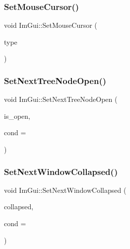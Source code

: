 \hypertarget{namespace_im_gui_ae212a3516efcba50a684df202c8e63ad}{}\label{namespace_im_gui_ae212a3516efcba50a684df202c8e63ad} 
\subsubsection{\texorpdfstring{Set\+Mouse\+Cursor()}{SetMouseCursor()}}
{\footnotesize\ttfamily void Im\+Gui\+::\+Set\+Mouse\+Cursor (\begin{DoxyParamCaption}\item[{Im\+Gui\+Mouse\+Cursor}]{type }\end{DoxyParamCaption})}

\hypertarget{namespace_im_gui_ab9a0c20b04a753449494fb20ec2e0e87}{}\label{namespace_im_gui_ab9a0c20b04a753449494fb20ec2e0e87} 
\subsubsection{\texorpdfstring{Set\+Next\+Tree\+Node\+Open()}{SetNextTreeNodeOpen()}}
{\footnotesize\ttfamily void Im\+Gui\+::\+Set\+Next\+Tree\+Node\+Open (\begin{DoxyParamCaption}\item[{bool}]{is\+\_\+open,  }\item[{Im\+Gui\+Cond}]{cond = {} }\end{DoxyParamCaption})}

\hypertarget{namespace_im_gui_a3e9380e253a3c49665a404e56950a52a}{}\label{namespace_im_gui_a3e9380e253a3c49665a404e56950a52a} 
\subsubsection{\texorpdfstring{Set\+Next\+Window\+Collapsed()}{SetNextWindowCollapsed()}}
{\footnotesize\ttfamily void Im\+Gui\+::\+Set\+Next\+Window\+Collapsed (\begin{DoxyParamCaption}\item[{bool}]{collapsed,  }\item[{Im\+Gui\+Cond}]{cond = {} }\end{DoxyParamCaption})}


